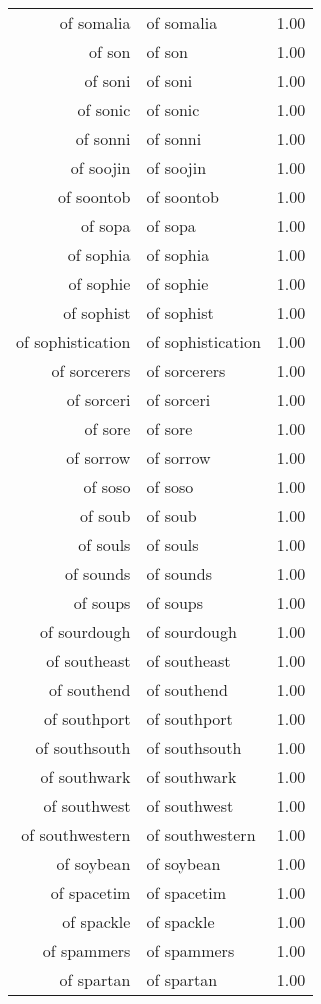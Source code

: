 \begin{table}[ht]
\begin{tabular}{rlr}
  of somalia & of somalia & 1.00 \\ 
  of son & of son & 1.00 \\ 
  of soni & of soni & 1.00 \\ 
  of sonic & of sonic & 1.00 \\ 
  of sonni & of sonni & 1.00 \\ 
  of soojin & of soojin & 1.00 \\ 
  of soontob & of soontob & 1.00 \\ 
  of sopa & of sopa & 1.00 \\ 
  of sophia & of sophia & 1.00 \\ 
  of sophie & of sophie & 1.00 \\ 
  of sophist & of sophist & 1.00 \\ 
  of sophistication & of sophistication & 1.00 \\ 
  of sorcerers & of sorcerers & 1.00 \\ 
  of sorceri & of sorceri & 1.00 \\ 
  of sore & of sore & 1.00 \\ 
  of sorrow & of sorrow & 1.00 \\ 
  of soso & of soso & 1.00 \\ 
  of soub & of soub & 1.00 \\ 
  of souls & of souls & 1.00 \\ 
  of sounds & of sounds & 1.00 \\ 
  of soups & of soups & 1.00 \\ 
  of sourdough & of sourdough & 1.00 \\ 
  of southeast & of southeast & 1.00 \\ 
  of southend & of southend & 1.00 \\ 
  of southport & of southport & 1.00 \\ 
  of southsouth & of southsouth & 1.00 \\ 
  of southwark & of southwark & 1.00 \\ 
  of southwest & of southwest & 1.00 \\ 
  of southwestern & of southwestern & 1.00 \\ 
  of soybean & of soybean & 1.00 \\ 
  of spacetim & of spacetim & 1.00 \\ 
  of spackle & of spackle & 1.00 \\ 
  of spammers & of spammers & 1.00 \\ 
  of spartan & of spartan & 1.00 \\ 

\end{tabular}
\end{table}
